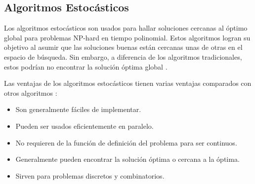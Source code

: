 \subsection{Algoritmos Estocásticos}

    Los algoritmos estocásticos son usados para hallar soluciones
cercanas al óptimo global para problemas NP-hard en tiempo polinomial. Estos
algoritmos logran su objetivo al asumir que las soluciones buenas están
cercanas unas de otras en el espacio de búsqueda. Sin embargo, a diferencia de
los algoritmos tradicionales, estos podrían no encontrar la solución óptima
global \cite{PSO_0}.

    Las ventajas de los algoritmos estocásticos tienen varias
ventajas comparados con otros algoritmos \cite{SA_1}:
\begin{itemize}
    \item Son generalmente fáciles de implementar.
    \item Pueden ser usados eficientemente en paralelo.
    \item No requieren de la función de definición del problema para ser
continuos.
    \item Generalmente pueden encontrar la solución óptima o cercana a la
óptima.
    \item Sirven para problemas discretos y combinatorios.
\end{itemize}

